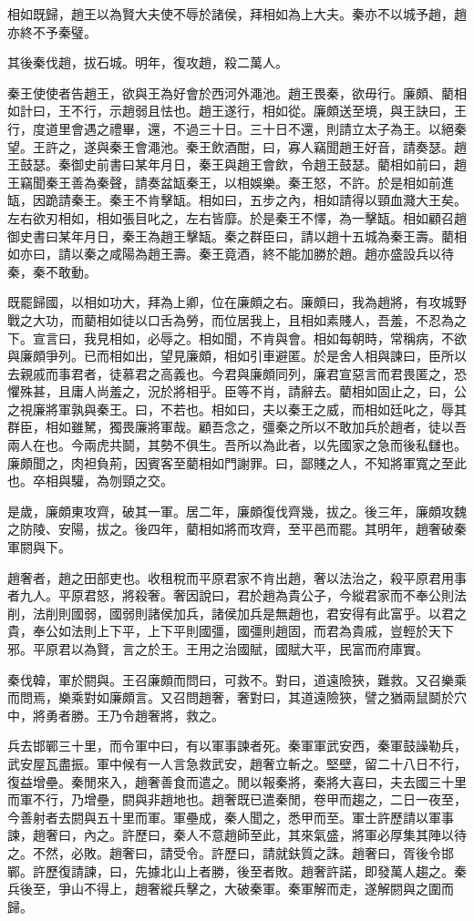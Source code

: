相如既歸，趙王以為賢大夫使不辱於諸侯，拜相如為上大夫。秦亦不以城予趙，趙亦終不予秦璧。

其後秦伐趙，拔石城。明年，復攻趙，殺二萬人。

秦王使使者告趙王，欲與王為好會於西河外澠池。趙王畏秦，欲毋行。廉頗、藺相如計曰，王不行，示趙弱且怯也。趙王遂行，相如從。廉頗送至境，與王訣曰，王行，度道里會遇之禮畢，還，不過三十日。三十日不還，則請立太子為王。以絕秦望。王許之，遂與秦王會澠池。秦王飲酒酣，曰，寡人竊聞趙王好音，請奏瑟。趙王鼓瑟。秦御史前書曰某年月日，秦王與趙王會飲，令趙王鼓瑟。藺相如前曰，趙王竊聞秦王善為秦聲，請奏盆缻秦王，以相娛樂。秦王怒，不許。於是相如前進缻，因跪請秦王。秦王不肯擊缻。相如曰，五步之內，相如請得以頸血濺大王矣。左右欲刃相如，相如張目叱之，左右皆靡。於是秦王不懌，為一擊缻。相如顧召趙御史書曰某年月日，秦王為趙王擊缻。秦之群臣曰，請以趙十五城為秦王壽。藺相如亦曰，請以秦之咸陽為趙王壽。秦王竟酒，終不能加勝於趙。趙亦盛設兵以待秦，秦不敢動。

既罷歸國，以相如功大，拜為上卿，位在廉頗之右。廉頗曰，我為趙將，有攻城野戰之大功，而藺相如徒以口舌為勞，而位居我上，且相如素賤人，吾羞，不忍為之下。宣言曰，我見相如，必辱之。相如聞，不肯與會。相如每朝時，常稱病，不欲與廉頗爭列。已而相如出，望見廉頗，相如引車避匿。於是舍人相與諫曰，臣所以去親戚而事君者，徒慕君之高義也。今君與廉頗同列，廉君宣惡言而君畏匿之，恐懼殊甚，且庸人尚羞之，況於將相乎。臣等不肖，請辭去。藺相如固止之，曰，公之視廉將軍孰與秦王。曰，不若也。相如曰，夫以秦王之威，而相如廷叱之，辱其群臣，相如雖駑，獨畏廉將軍哉。顧吾念之，彊秦之所以不敢加兵於趙者，徒以吾兩人在也。今兩虎共鬬，其勢不俱生。吾所以為此者，以先國家之急而後私讎也。廉頗聞之，肉袒負荊，因賓客至藺相如門謝罪。曰，鄙賤之人，不知將軍寬之至此也。卒相與驩，為刎頸之交。

是歲，廉頗東攻齊，破其一軍。居二年，廉頗復伐齊幾，拔之。後三年，廉頗攻魏之防陵、安陽，拔之。後四年，藺相如將而攻齊，至平邑而罷。其明年，趙奢破秦軍閼與下。

趙奢者，趙之田部吏也。收租稅而平原君家不肯出趙，奢以法治之，殺平原君用事者九人。平原君怒，將殺奢。奢因說曰，君於趙為貴公子，今縱君家而不奉公則法削，法削則國弱，國弱則諸侯加兵，諸侯加兵是無趙也，君安得有此富乎。以君之貴，奉公如法則上下平，上下平則國彊，國彊則趙固，而君為貴戚，豈輕於天下邪。平原君以為賢，言之於王。王用之治國賦，國賦大平，民富而府庫實。

秦伐韓，軍於閼與。王召廉頗而問曰，可救不。對曰，道遠險狹，難救。又召樂乘而問焉，樂乘對如廉頗言。又召問趙奢，奢對曰，其道遠險狹，譬之猶兩鼠鬬於穴中，將勇者勝。王乃令趙奢將，救之。

兵去邯鄲三十里，而令軍中曰，有以軍事諫者死。秦軍軍武安西，秦軍鼓譟勒兵，武安屋瓦盡振。軍中候有一人言急救武安，趙奢立斬之。堅壁，留二十八日不行，復益增壘。秦閒來入，趙奢善食而遣之。閒以報秦將，秦將大喜曰，夫去國三十里而軍不行，乃增壘，閼與非趙地也。趙奢既已遣秦閒，卷甲而趨之，二日一夜至，今善射者去閼與五十里而軍。軍壘成，秦人聞之，悉甲而至。軍士許歷請以軍事諫，趙奢曰，內之。許歷曰，秦人不意趙師至此，其來氣盛，將軍必厚集其陣以待之。不然，必敗。趙奢曰，請受令。許歷曰，請就鈇質之誅。趙奢曰，胥後令邯鄲。許歷復請諫，曰，先據北山上者勝，後至者敗。趙奢許諾，即發萬人趨之。秦兵後至，爭山不得上，趙奢縱兵擊之，大破秦軍。秦軍解而走，遂解閼與之圍而歸。

